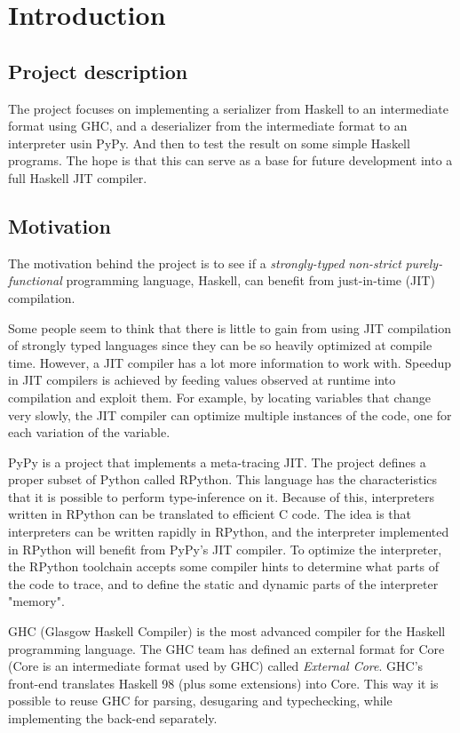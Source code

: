 
\section{Introduction}

\subsection{Project description}

The project focuses on implementing a serializer from Haskell to an intermediate
format using GHC, and a deserializer from the intermediate format to an
interpreter usin PyPy. And then to test the result on some simple Haskell
programs. The hope is that this can serve as a base for future development
into a full Haskell JIT compiler.

\subsection{Motivation}

The motivation behind the project is to see if a \emph{strongly-typed} 
\emph{non-strict} \emph{purely-functional} programming language, Haskell, 
can benefit from just-in-time (JIT) compilation.

Some people seem to think that there is little to gain from using 
JIT compilation of strongly typed languages since they can be
so heavily optimized at compile time. However, a JIT compiler has a lot
more information to work with. Speedup in JIT compilers is achieved by
feeding values observed at runtime into compilation and exploit them.
For example, by locating variables that change very slowly, the JIT compiler can
optimize multiple instances of the code, one for each variation of the
variable. \cite{bolz2011runtime}

PyPy is a project that implements a meta-tracing JIT. The project
defines a proper subset of Python called RPython. This language has 
the characteristics that it is possible to perform type-inference on it.
Because of this, interpreters written in RPython can be translated to
efficient C code.
The idea is that interpreters can be written rapidly in RPython, and the
interpreter implemented in RPython will benefit from PyPy's JIT compiler.
To optimize the interpreter, the RPython toolchain accepts some compiler
hints to determine what parts of the code to trace, and to define the 
static and dynamic parts of the interpreter "memory". \cite{bolz2011runtime}

GHC (Glasgow Haskell Compiler) is the most advanced compiler for the
Haskell programming language. The GHC team has defined an external format
for Core (Core is an intermediate format used by GHC) called \emph{External Core}. 
GHC's front-end translates Haskell 98 (plus some extensions) into Core. 
This way it is possible to reuse GHC for parsing, desugaring and typechecking, 
while implementing the back-end separately. \cite{tolmach2010ghc}

